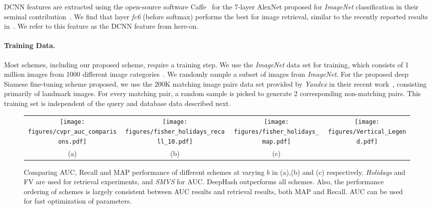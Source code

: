\documentclass[10pt,twocolumn,letterpaper]{article}
\begin{document}
DCNN features are extracted using the open-source software Caffe~\cite{Caffe} for the 7-layer AlexNet proposed for {\it ImageNet} classification in their seminal contribution~\cite{AlexNet}.
We find that layer {\it fc6} (before softmax) performs the best for image retrieval, similar to the recently reported results in~\cite{Yandex}.
We refer to this feature as the DCNN feature from here-on.

\vspace{-0.1em}
\paragraph{Training Data.}
Most schemes, including our proposed scheme, require a training step.
We use the {\it ImageNet} data set for training, which consists of 1 million images from 1000 different image categories~\cite{DengImagenet}.
We randomly sample a subset of images from {\it ImageNet}.
For the proposed deep Siamese fine-tuning scheme proposed, we use the 200K matching image pairs data set provided by {\it Yandex} in their recent work~\cite{Yandex}, consisting primarily of landmark images. 
For every matching pair, a random sample is picked to generate 2 corresponding non-matching pairs.
This training set is independent of the query and database data described next.

\begin{figure*}
	\centering
		\begin{tabular}{ @{}c@{} @{}c@{} @{}c@{} @{}c@{}}
			\texttt{[image: figures/cvpr\_auc\_comparisons.pdf]} &
			\texttt{[image: figures/fisher\_holidays\_recall\_10.pdf]} & 
			\texttt{[image: figures/fisher\_holidays\_map.pdf]} & 
			\texttt{[image: figures/Vertical\_Legend.pdf]}  \\ 			
			(a) & (b) & (c) &  \\
		\end{tabular}
		\caption{\footnotesize 
		Comparing AUC, Recall and MAP performance of different schemes at varying $b$ in (a),(b) and (c) respectively. {\it Holidays} and FV are used for retrieval experiments, and {\it SMVS} for AUC. DeepHash outperforms all schemes.  Also, the performance ordering of schemes is largely consistent between AUC results and retrieval results, both MAP and Recall. AUC can be used for fast optimization of parameters.
		}	
		\label{fig:auc_all}
		
\end{figure*}

\vspace{-0.1em}
\end{document}
